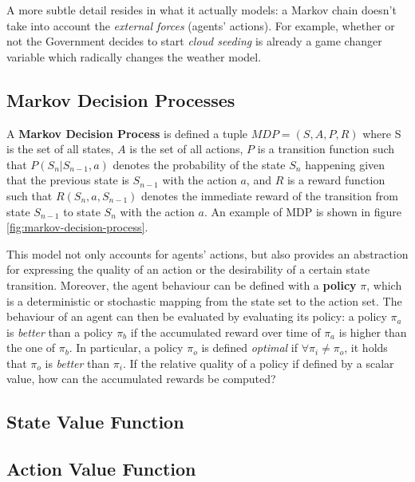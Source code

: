 A more subtle detail resides in what it actually models: a Markov chain doesn't take into account the \textit{external forces} (agents' actions). For example, whether or not the Government decides to start \textit{cloud seeding} is already a game changer variable which radically changes the weather model.


\subsection{Markov Decision Processes}

A \textbf{Markov Decision Process} is defined a tuple $MDP = (S, A, P, R)$ where S is the set of all states, $A$ is the set of all actions, $P$ is a transition function such that $P(S_n | S_{n-1}, a)$ denotes the probability of the state $S_n$ happening given that the previous state is $S_{n-1}$ with the action $a$, and $R$ is a reward function such that $R(S_{n}, a, S_{n-1})$ denotes the immediate reward of the transition from state $S_{n-1}$ to state $S_n$ with the action $a$. An example of MDP is shown in figure \ref{fig:markov-decision-process}.

This model not only accounts for agents' actions, but also provides an abstraction for expressing the quality of an action or the desirability of a certain state transition.
Moreover, the agent behaviour can be defined with a \textbf{policy} $\pi$, which is a deterministic or stochastic mapping from the state set to the action set.
The behaviour of an agent can then be evaluated by evaluating its policy: a policy $\pi _ a$ is \textit{better} than a policy $\pi _ b$ if the accumulated reward over time of $\pi _ a$ is higher than the one of $\pi _ b$.
In particular, a policy $\pi _ o$ is defined \textit{optimal} if $\forall \pi _ i \neq \pi _ o$, it holds that $\pi _o $ is \textit{better} than $\pi _ i$.
If the relative quality of a policy if defined by a scalar value, how can the accumulated rewards be computed?


\subsection{State Value Function}

\subsection{Action Value Function}
